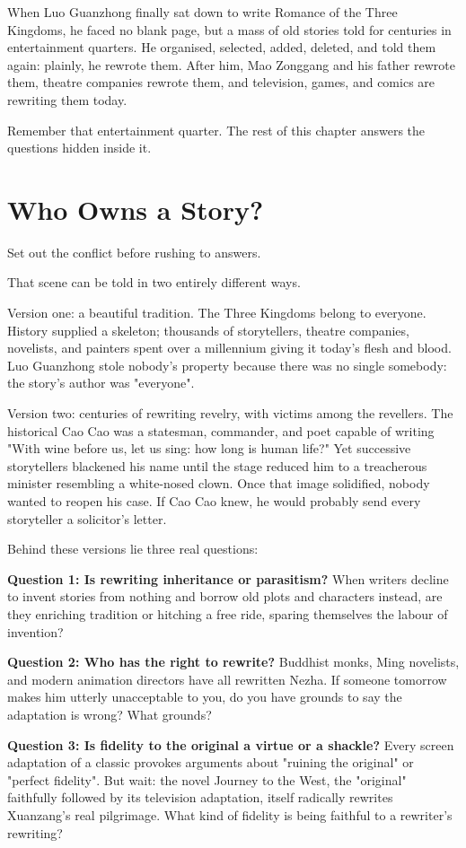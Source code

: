 When Luo Guanzhong finally sat down to write Romance of the Three Kingdoms, he faced no blank page, but a mass of old stories told for centuries in entertainment quarters. He organised, selected, added, deleted, and told them again: plainly, he rewrote them. After him, Mao Zonggang and his father rewrote them, theatre companies rewrote them, and television, games, and comics are rewriting them today.

Remember that entertainment quarter. The rest of this chapter answers the questions hidden inside it.

\section{Who Owns a Story?}
Set out the conflict before rushing to answers.

That scene can be told in two entirely different ways.

Version one: a beautiful tradition. The Three Kingdoms belong to everyone. History supplied a skeleton; thousands of storytellers, theatre companies, novelists, and painters spent over a millennium giving it today's flesh and blood. Luo Guanzhong stole nobody's property because there was no single somebody: the story's author was "everyone".

Version two: centuries of rewriting revelry, with victims among the revellers. The historical Cao Cao was a statesman, commander, and poet capable of writing "With wine before us, let us sing: how long is human life?" Yet successive storytellers blackened his name until the stage reduced him to a treacherous minister resembling a white-nosed clown. Once that image solidified, nobody wanted to reopen his case. If Cao Cao knew, he would probably send every storyteller a solicitor's letter.

Behind these versions lie three real questions:

\textbf{Question 1: Is rewriting inheritance or parasitism?} When writers decline to invent stories from nothing and borrow old plots and characters instead, are they enriching tradition or hitching a free ride, sparing themselves the labour of invention?

\textbf{Question 2: Who has the right to rewrite?} Buddhist monks, Ming novelists, and modern animation directors have all rewritten Nezha. If someone tomorrow makes him utterly unacceptable to you, do you have grounds to say the adaptation is wrong? What grounds?

\textbf{Question 3: Is fidelity to the original a virtue or a shackle?} Every screen adaptation of a classic provokes arguments about "ruining the original" or "perfect fidelity". But wait: the novel Journey to the West, the "original" faithfully followed by its television adaptation, itself radically rewrites Xuanzang's real pilgrimage. What kind of fidelity is being faithful to a rewriter's rewriting?

